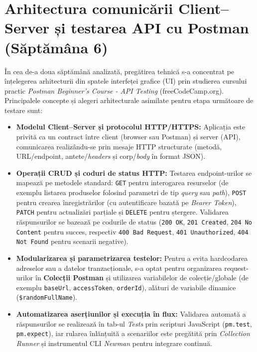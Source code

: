 \section{Arhitectura comunicării Client--Server și testarea API cu Postman (Săptămâna 6)}

În cea de-a doua săptămână analizată, pregătirea tehnică s-a concentrat pe înțelegerea arhitecturii din spatele interfeței grafice (UI) prin studierea cursului practic \textit{Postman Beginner's Course - API Testing} (freeCodeCamp.org). Principalele concepte și alegeri arhitecturale asimilate pentru etapa următoare de testare sunt:

\begin{itemize}
    \item \textbf{Modelul Client--Server și protocolul HTTP/HTTPS:} Aplicația este privită ca un contract între client (browser sau Postman) și server (API), comunicarea realizându-se prin mesaje HTTP structurate (metodă, URL/endpoint, antete/\textit{headers} și corp/\textit{body} în format JSON).
    \item \textbf{Operații CRUD și coduri de status HTTP:} Testarea endpoint-urilor se mapează pe metodele standard: \texttt{GET} pentru interogarea resurselor (de exemplu listarea produselor folosind parametri de tip \textit{query} sau \textit{path}), \texttt{POST} pentru crearea înregistrărilor (cu autentificare bazată pe \textit{Bearer Token}), \texttt{PATCH} pentru actualizări parțiale și \texttt{DELETE} pentru ștergere. Validarea răspunsurilor se bazează pe codurile de status (\texttt{200 OK}, \texttt{201 Created}, \texttt{204 No Content} pentru succes, respectiv \texttt{400 Bad Request}, \texttt{401 Unauthorized}, \texttt{404 Not Found} pentru scenarii negative).
    \item \textbf{Modularizarea și parametrizarea testelor:} Pentru a evita hardcodarea adreselor sau a datelor tranzacționale, s-a optat pentru organizarea request-urilor în \textbf{Colecții Postman} și utilizarea variabilelor de colecție/globale (de exemplu \texttt{baseUrl}, \texttt{accessToken}, \texttt{orderId}), alături de variabile dinamice (\texttt{\$randomFullName}).
    \item \textbf{Automatizarea aserțiunilor și execuția în flux:} Validarea automată a răspunsurilor se realizează în tab-ul \textit{Tests} prin scripturi JavaScript (\texttt{pm.test}, \texttt{pm.expect}), iar rularea înlănțuită a scenariilor este pregătită prin \textit{Collection Runner} și instrumentul CLI \textit{Newman} pentru integrare continuă.
\end{itemize}